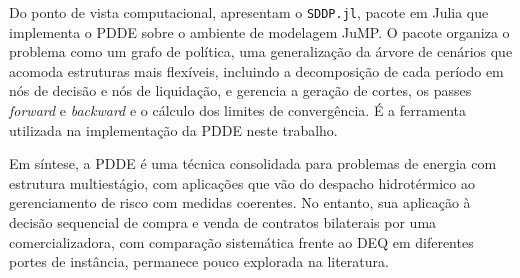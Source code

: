 Do ponto de vista computacional,  apresentam o \texttt{SDDP.jl}, pacote em Julia que implementa o PDDE sobre o ambiente de modelagem JuMP. O pacote organiza o problema como um grafo de política, uma generalização da árvore de cenários que acomoda estruturas mais flexíveis, incluindo a decomposição de cada período em nós de decisão e nós de liquidação, e gerencia a geração de cortes, os passes \emph{forward} e \emph{backward} e o cálculo dos limites de convergência. É a ferramenta utilizada na implementação da PDDE neste trabalho.

Em síntese, a PDDE é uma técnica consolidada para problemas de energia com estrutura multiestágio, com aplicações que vão do despacho hidrotérmico ao gerenciamento de risco com medidas coerentes. No entanto, sua aplicação à decisão sequencial de compra e venda de contratos bilaterais por uma comercializadora, com comparação sistemática frente ao DEQ em diferentes portes de instância, permanece pouco explorada na literatura.
